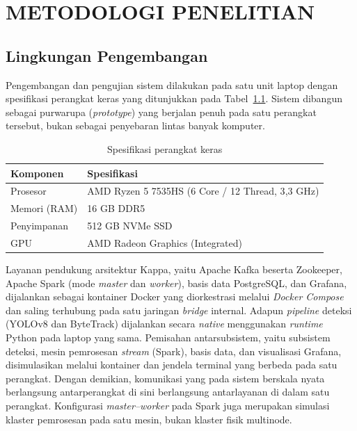 \chapter{METODOLOGI PENELITIAN}
\label{chap:metodologi}

\section{Lingkungan Pengembangan}
Pengembangan dan pengujian sistem dilakukan pada satu unit laptop dengan spesifikasi perangkat keras yang ditunjukkan pada Tabel~\ref{tab:spek-hardware}. Sistem dibangun sebagai purwarupa (\textit{prototype}) yang berjalan penuh pada satu perangkat tersebut, bukan sebagai penyebaran lintas banyak komputer.

\begin{table}[h]
  \centering
  \caption{Spesifikasi perangkat keras}
  \label{tab:spek-hardware}
  \footnotesize
  \setlength{\tabcolsep}{4pt}
  \begin{tabular}{p{} p{}}
    \toprule
    \textbf{Komponen} & \textbf{Spesifikasi} \\
    \midrule
    Prosesor            & AMD Ryzen 5 7535HS (6 Core / 12 Thread, 3{,}3 GHz) \\
    Memori (RAM)        & 16 GB DDR5 \\
    Penyimpanan         & 512 GB NVMe SSD \\
    GPU                 & AMD Radeon Graphics (Integrated) \\
    \bottomrule
  \end{tabular}
\end{table}

Layanan pendukung arsitektur Kappa, yaitu Apache Kafka beserta Zookeeper, Apache Spark (mode \textit{master} dan \textit{worker}), basis data PostgreSQL, dan Grafana, dijalankan sebagai kontainer Docker yang diorkestrasi melalui \textit{Docker Compose} dan saling terhubung pada satu jaringan \textit{bridge} internal. Adapun \textit{pipeline} deteksi (YOLOv8 dan ByteTrack) dijalankan secara \textit{native} menggunakan \textit{runtime} Python pada laptop yang sama. Pemisahan antarsubsistem, yaitu subsistem deteksi, mesin pemrosesan \textit{stream} (Spark), basis data, dan visualisasi Grafana, disimulasikan melalui kontainer dan jendela terminal yang berbeda pada satu perangkat. Dengan demikian, komunikasi yang pada sistem berskala nyata berlangsung antarperangkat di sini berlangsung antarlayanan di dalam satu perangkat. Konfigurasi \textit{master--worker} pada Spark juga merupakan simulasi klaster pemrosesan pada satu mesin, bukan klaster fisik multinode.


